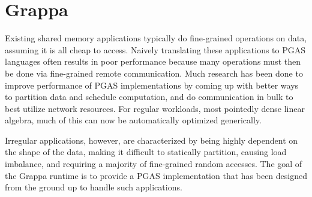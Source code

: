 \section{Grappa}
Existing shared memory applications typically do fine-grained operations on data, assuming it is all cheap to access.
Naively translating these applications to PGAS languages often results in poor performance because many operations must then be done via fine-grained remote communication.
Much research has been done to improve performance of PGAS implementations by coming up with better ways to partition data and schedule computation, and do communication in bulk to best utilize network resources.
For regular workloads, most pointedly dense linear algebra, much of this can now be automatically optimized generically.

Irregular applications, however, are characterized by being highly dependent on the shape of the data, making it difficult to statically partition, causing load imbalance, and requiring a majority of fine-grained random accesses. The goal of the Grappa runtime is to provide a PGAS implementation that has been designed from the ground up to handle such applications.